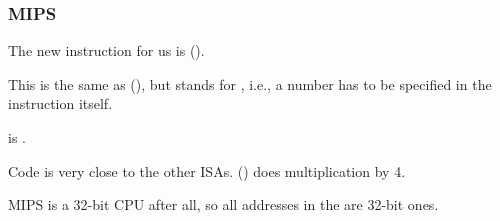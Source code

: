 \subsubsection{MIPS}




The new instruction for us is  ().

This is the same as  (), but  stands for , 
i.e., a number has to be specified in the instruction itself.

 is .

Code is very close to the other \ac{ISA}s.
 () does multiplication by 4.

MIPS is a 32-bit CPU after all, so all addresses in the  are 32-bit ones.

